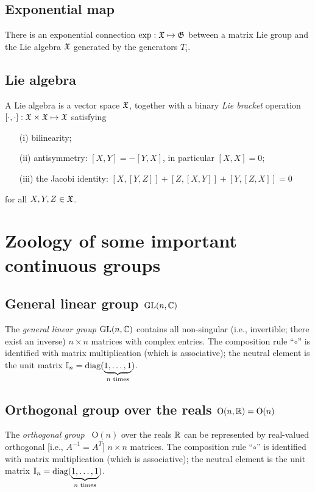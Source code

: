 \subsection{Exponential map}
There is an exponential connection
$\exp : {\frak X} \mapsto {\frak G}$
between a matrix Lie group
and the Lie algebra ${\frak X}$ generated by the generators
$ T_i $.

\subsection{Lie algebra}

A Lie algebra is a vector space ${\frak X}$,
together with a binary
{\em Lie bracket}
operation $[\cdot,\cdot ]: {\frak X} \times {\frak X}  \mapsto {\frak X} $
satisfying
\begin{itemize}
\item[(i)]
bilinearity;
\item[(ii)]
antisymmetry: $[X,Y]=-[Y,X]$, in particular $[X,X]=0$;
\item[(iii)]
the Jacobi identity:
$[X,[Y,Z]] +  [Z,[X,Y]] + [Y,[Z,X]] =0$
\end{itemize}
for all $X,Y,Z \in {\frak X}$.


\section{Zoology of some important continuous groups}

\subsection{General linear group $\textrm{GL}(n,{\Bbb C})$}

The {\em general linear group} $\textrm{GL}(n,{\Bbb C})$
contains all  non-singular (i.e., invertible; there exist an inverse)
$n\times n$ matrices with complex entries.
The composition rule ``$\circ$''
is identified with matrix multiplication (which is associative); the neutral element is the unit
matrix ${\Bbb I}_n=\textrm{diag}(\underbrace{1,\ldots ,1}_{n \textrm{ times}})$.

\subsection{Orthogonal group over the reals $\textrm{O}(n,{\Bbb R})=\textrm{O}(n)$}

The {\em orthogonal group}~\cite{murnaghan} $\textrm{O}(n)$ over the reals ${\Bbb R}$
can be represented by real-valued  orthogonal [i.e., $  A  ^{-1}=    A   ^T$]
$n\times n$ matrices.
The composition rule ``$\circ$''
is identified with matrix multiplication (which is associative); the neutral element is the unit
matrix ${\Bbb I}_n=\textrm{diag}(\underbrace{1,\ldots ,1}_{n \textrm{ times}})$.

